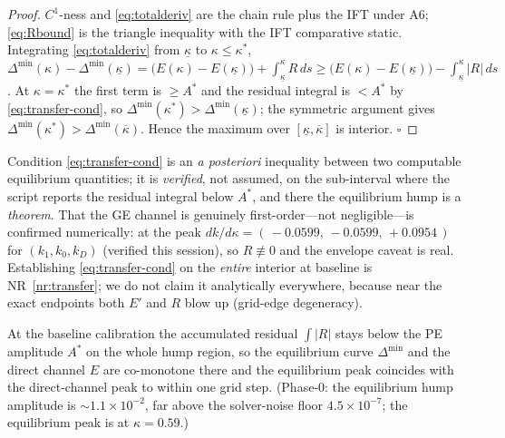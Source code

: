 \begin{proof}
$C^1$-ness and \eqref{eq:totalderiv} are the chain rule plus the IFT under A6;
\eqref{eq:Rbound} is the triangle inequality with the IFT comparative static.
Integrating \eqref{eq:totalderiv} from $\underline\kappa$ to
$\kappa\le\kappa^\ast$,
$\Delta^{\min}(\kappa)-\Delta^{\min}(\underline\kappa)
=\big(E(\kappa)-E(\underline\kappa)\big)+\int_{\underline\kappa}^{\kappa}R\,ds
\ge\big(E(\kappa)-E(\underline\kappa)\big)-\int_{\underline\kappa}^{\kappa}|R|\,ds$.
At $\kappa=\kappa^\ast$ the first term is $\ge A^\ast$ and the residual integral
is $<A^\ast$ by \eqref{eq:transfer-cond}, so
$\Delta^{\min}(\kappa^\ast)>\Delta^{\min}(\underline\kappa)$; the symmetric
argument gives $\Delta^{\min}(\kappa^\ast)>\Delta^{\min}(\overline\kappa)$.
Hence the maximum over $[\underline\kappa,\overline\kappa]$ is interior.
\hfill$\square$
\end{proof}

\begin{remark}
\label{rem:transfer-honest}
Condition \eqref{eq:transfer-cond} is an \emph{a posteriori} inequality between
two computable equilibrium quantities; it is \emph{verified}, not assumed, on
the sub-interval where the script reports the residual integral below $A^\ast$,
and there the equilibrium hump is a \emph{theorem}. That the GE channel is
genuinely first-order---not negligible---is confirmed numerically: at the peak
$dk/d\kappa=(\,-0.0599,\,-0.0599,\,+0.0954\,)$ for $(k_1,k_0,k_D)$ (verified
this session), so $R\not\equiv0$ and the envelope caveat is real. Establishing
\eqref{eq:transfer-cond} on the \emph{entire} interior at baseline is
NR~\ref{nr:transfer}; we do not claim it analytically everywhere, because near
the exact endpoints both $E'$ and $R$ blow up (grid-edge degeneracy).
\end{remark}

\begin{numreg}
\label{nr:transfer}
At the baseline calibration the accumulated residual $\int|R|$ stays below the
PE amplitude $A^\ast$ on the whole hump region, so the equilibrium curve
$\Delta^{\min}$ and the direct channel $E$ are co-monotone there and the
equilibrium peak coincides with the direct-channel peak to within one grid step.
(Phase-0: the equilibrium hump amplitude is $\sim1.1\times10^{-2}$, far above
the solver-noise floor $4.5\times10^{-7}$; the equilibrium peak is at
$\kappa=0.59$.)
\end{numreg}

